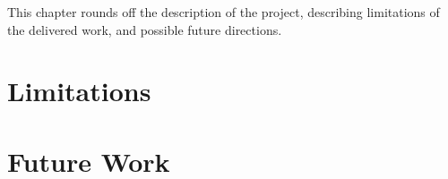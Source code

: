 This chapter rounds off the description of the project, describing limitations of the delivered work, and possible future directions.

\section{Limitations}\label{sec:limitations}

\section{Future Work}

